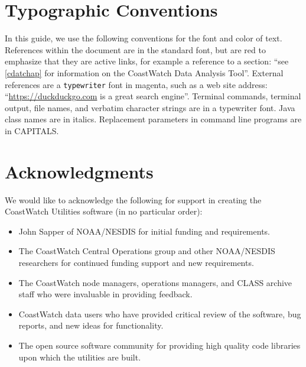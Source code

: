\section*{Typographic Conventions}

In this guide, we use the following conventions for the font and
color of text.  References within the document are in the
standard font, but are red to emphasize that they are active
links, for example a reference to a section: ``see
\autoref{cdatchap} for information on the CoastWatch Data
Analysis Tool''.  External references are a {\tt typewriter}
font in magenta, such as a web site address:
``\url{https://duckduckgo.com} is a great search engine''.
Terminal commands, terminal output, file names, and verbatim
character strings are in a {\file typewriter} font.  Java class
names are in {\java italics}.  Replacement parameters in command
line programs are in CAPITALS.

\section*{Acknowledgments}

We would like to acknowledge the following for support in
creating the CoastWatch Utilities software (in no particular
order):
\begin{itemize}

  \item John Sapper of NOAA/NESDIS for initial funding and requirements.

  \item The CoastWatch Central Operations group and other 
  NOAA/NESDIS researchers for continued funding support and new requirements.

  \item The CoastWatch node managers, operations managers, and
  CLASS archive staff who were invaluable in providing feedback.

  \item CoastWatch data users who have provided critical review
  of the software, bug reports, and new ideas for functionality.

  \item The open source software community for providing high
  quality code libraries upon which the utilities are built.

\end{itemize}
